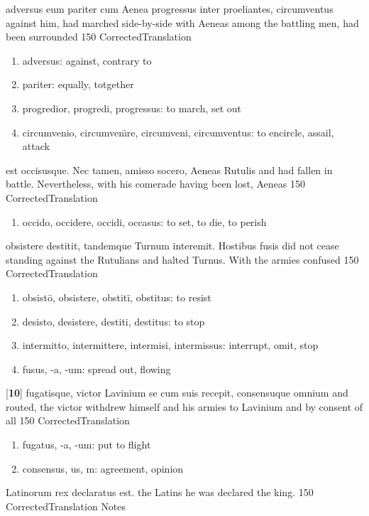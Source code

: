 \latline
  {adversus eum pariter cum Aenea progressus inter proeliantes, circumventus}
  { against him, had marched side-by-side with Aeneas among the battling men, had been surrounded }
  {150}
  { CorrectedTranslation }
  { \begin{enumerate}
  	\item adversus:  against, contrary to
  	\item pariter:  equally, totgether
  	\item progredior, progredi, progressus:  to march, set out
  	\item circumvenio, circumven\={\i}re, circumveni, circumventus:  to encircle, assail, attack
  \end{enumerate} }


\latline
  {est occisusque.  Nec tamen, amisso socero, Aeneas Rutulis}
  { and had fallen in battle.  Nevertheless, with his comerade having been lost, Aeneas  }
  {150}
  { CorrectedTranslation }
  { \begin{enumerate}
  	\item occido, occidere, occidi, occasus:  to set, to die, to perish
  \end{enumerate} }


\latline
  {obsistere destitit, tandemque Turnum interemit.  Hostibus fusis}
  { did not cease standing against the Rutulians and halted Turnus.  With the armies confused }
  {150}
  { CorrectedTranslation }
  { \begin{enumerate}
  	\item obsist\={o}, obsistere, obstit\={i}, obstitus:  to resist
  	\item desisto, desistere, destiti, destitus:  to stop
  	\item intermitto, intermittere, intermisi, intermissus:  interrupt, omit, stop
  	\item fusus, -a, -um:  spread out, flowing 
  \end{enumerate} }


\latline
  {[\textbf{10}] fugatisque, victor Lavinium se cum suis recepit, consensuque omnium}
  { and routed, the victor withdrew himself and his armies to Lavinium and by consent of all 	 }
  {150}
  { CorrectedTranslation }
  { \begin{enumerate}
  	\item fugatus, -a, -um: put to flight
  	\item consensus, us, m: agreement, opinion
  \end{enumerate} }


\latline
  {Latinorum rex declaratus est.}
  { the Latins he was declared the king. }
  {150}
  { CorrectedTranslation }
  { Notes }



